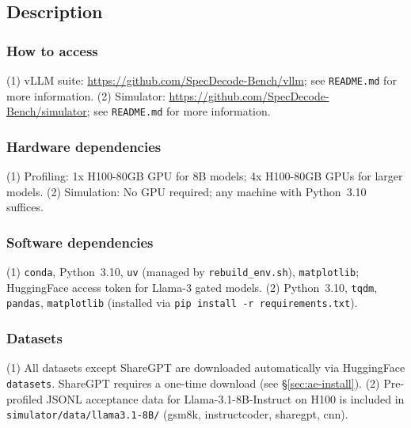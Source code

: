 \documentclass{article}
\begin{document}
\subsection{Description}
\label{sec:ae-desc}

\subsubsection{How to access}

(1) vLLM suite: \href{https://github.com/SpecDecode-Bench/vllm}{https://github.com/SpecDecode-Bench/vllm}; see \texttt{README.md} for more information.
(2) Simulator: \href{https://github.com/SpecDecode-Bench/simulator}{https://github.com/SpecDecode-Bench/simulator}; see \texttt{README.md} for more information.

\subsubsection{Hardware dependencies}

(1) Profiling: 1x H100-80GB GPU for 8B models; 4x H100-80GB GPUs for larger models.
(2) Simulation: No GPU required; any machine with Python~3.10 suffices. 

\subsubsection{Software dependencies}

(1) \texttt{conda}, Python~3.10, \texttt{uv} (managed by
\texttt{rebuild\_env.sh}), \texttt{matplotlib}; HuggingFace access token for Llama-3 gated models.
(2) Python~3.10, \texttt{tqdm}, \texttt{pandas}, \texttt{matplotlib}
(installed via \texttt{pip install -r requirements.txt}).

\subsubsection{Datasets}

(1) All datasets except ShareGPT are downloaded automatically via
HuggingFace \texttt{datasets}. ShareGPT requires a one-time download
(see \S\ref{sec:ae-install}).
(2) Pre-profiled JSONL acceptance data for Llama-3.1-8B-Instruct on
H100 is included in \texttt{simulator/data/llama3.1-8B/} (gsm8k,
instructcoder, sharegpt, cnn).
\end{document}

